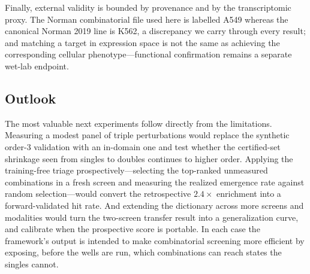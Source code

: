 Finally, external validity is bounded by provenance and by the transcriptomic proxy. The Norman
combinatorial file used here is labelled A549 whereas the canonical Norman 2019 line is K562, a
discrepancy we carry through every result; and matching a target in expression space is not the
same as achieving the corresponding cellular phenotype---functional confirmation remains a
separate wet-lab endpoint.

\subsection{Outlook}
The most valuable next experiments follow directly from the limitations. Measuring a modest panel
of triple perturbations would replace the synthetic order-$3$ validation with an in-domain one and
test whether the certified-set shrinkage seen from singles to doubles continues to higher order.
Applying the training-free triage prospectively---selecting the top-ranked unmeasured combinations
in a fresh screen and measuring the realized emergence rate against random selection---would
convert the retrospective $2.4\times$ enrichment into a forward-validated hit rate. And extending
the dictionary across more screens and modalities would turn the two-screen transfer result into a
generalization curve, and calibrate when the prospective score is portable. In each case the
framework's output is intended to make combinatorial screening more efficient by exposing, before
the wells are run, which combinations can reach states the singles cannot.

